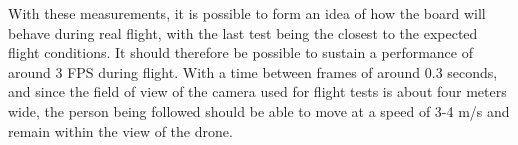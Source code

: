 With these measurements, it is possible to form an idea of how the board will behave during real flight, with the last test being the closest to the expected flight conditions.
It should therefore be possible to sustain a performance of around 3 FPS during flight.
With a time between frames of around 0.3 seconds, and since the field of view of the camera used for flight tests is about four meters wide, the person being followed should be able to move at a speed of 3-4 m/s and remain within the view of the drone.


